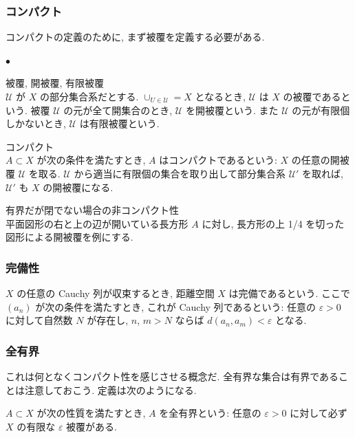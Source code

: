 \documentclass[openany, a4paper, oneside]{book}
\newcounter{enum2}
\renewenvironment{itemize}{%
\begin{list}{$\bullet$\ \ }%
{%
\usecounter{enum2}
\setlength{\itemindent}{0pt}%
\setlength{\leftmargin}{6pt}%
\setlength{\rightmargin}{0pt}%
\setlength{\labelsep}{0pt}%
\setlength{\labelwidth}{6pt}%
\setlength{\itemsep}{0pt}%
\setlength{\parsep}{0pt}%
\setlength{\listparindent}{0pt}%
}
}{%
\end{list}%
}
\theoremstyle{break}
\theoremstyle{breakdefn}
\begin{document}
\subsubsection{コンパクト}
\label{sec-11-3-17-4-3}

コンパクトの定義のために, まず被覆を定義する必要がある.
\begin{itemize}

\item 被覆, 開被覆, 有限被覆\\
\label{sec-11-3-17-4-3-1}%
$\mathcal{U}$ が $X$ の部分集合系だとする.
$\cup_{U \in \mathcal{U}} = X$ となるとき, $\mathcal{U}$ は $X$ の被覆であるという.
被覆 $\mathcal{U}$ の元が全て開集合のとき, $\mathcal{U}$ を開被覆という.
また $\mathcal{U}$ の元が有限個しかないとき, $\mathcal{U}$ は有限被覆という.

\item コンパクト\\
\label{sec-11-3-17-4-3-2}%
$A \subset X$ が次の条件を満たすとき, $A$ はコンパクトであるという:
$X$ の任意の開被覆 $\mathcal{U}$ を取る.
$\mathcal{U}$ から適当に有限個の集合を取り出して部分集合系 $\mathcal{U}'$ を取れば,
$\mathcal{U}'$ も $X$ の開被覆になる.

\item 有界だが閉でない場合の非コンパクト性\\
\label{sec-11-3-17-4-3-3}%
平面図形の右と上の辺が開いている長方形 $A$ に対し, 長方形の上 1/4 を切った図形による開被覆を例にする.
\end{itemize} %
\subsubsection{完備性}
\label{sec-11-3-17-4-4}

$X$ の任意の Cauchy 列が収束するとき, 距離空間 $X$ は完備であるという.
ここで $\left ( a_n \right)$ が次の条件を満たすとき, これが Cauchy 列であるという:
任意の $\varepsilon > 0$ に対して自然数 $N$ が存在し, $n$, $m > N$ ならば $d (a_n, a_m) < \varepsilon$ となる.
\subsubsection{全有界}
\label{sec-11-3-17-4-5}

これは何となくコンパクト性を感じさせる概念だ.
全有界な集合は有界であることは注意しておこう.
定義は次のようになる.

$A \subset X$ が次の性質を満たすとき, $A$ を全有界という:
任意の $\varepsilon > 0$ に対して必ず $X$ の有限な $\varepsilon$ 被覆がある.
\end{document}
